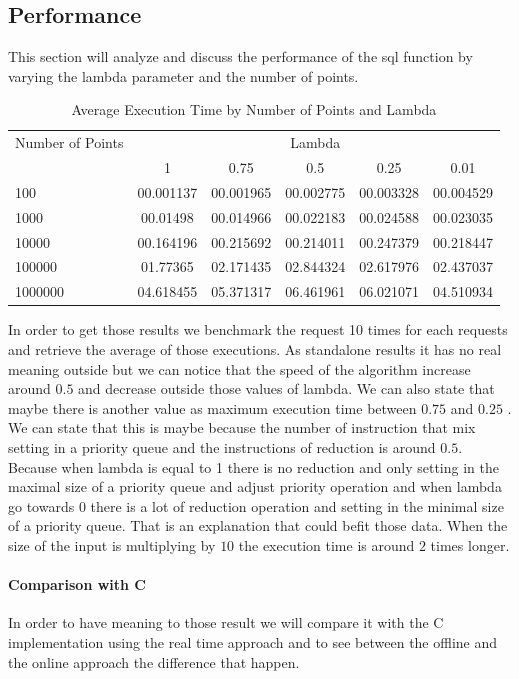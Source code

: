 \subsection{Performance}
This section will analyze and discuss the performance of the sql function by varying the lambda parameter and the number of points.
\begin{table}[htbp]
\centering
\label{tab:execution_time}
\begin{tabular}{@{}lccccc@{}}
\toprule
Number of Points & \multicolumn{5}{c}{Lambda} \\
\cmidrule{2-6}
& 1         & 0.75       & 0.5        & 0.25       & 0.01       \\
\midrule
100              & 00.001137 & 00.001965 & 00.002775 & 00.003328 & 00.004529 \\
1000             & 00.01498  & 00.014966 & 00.022183 & 00.024588 & 00.023035 \\
10000            & 00.164196 & 00.215692 & 00.214011 & 00.247379 & 00.218447 \\
100000           & 01.77365  & 02.171435 & 02.844324 & 02.617976 & 02.437037 \\
1000000          & 04.618455 & 05.371317 & 06.461961 & 06.021071 & 04.510934 \\
\bottomrule
\end{tabular}
\caption{Average Execution Time by Number of Points and Lambda}
\end{table}

In order to get those results we benchmark the request 10 times for each requests and retrieve the average of those executions. As standalone results it has no real meaning outside but we can notice that the speed of the algorithm increase around $0.5$ and decrease outside those values of lambda. We can also state that maybe there is another value as maximum execution time between $0.75$ and $0.25$ . We can state that this is maybe because the number of instruction that mix setting in a priority queue and the instructions of reduction is around $0.5$. Because when lambda is equal to 1 there is no reduction and only setting in the maximal size of a priority queue and adjust priority operation and when lambda go towards $0$ there is a lot of reduction operation and setting in the minimal size of a priority queue. That is an explanation that could befit those data. When the size of the input is multiplying by $10$ the execution time is around $2$ times longer.

\paragraph{Comparison with C}
In order to have meaning to those result we will compare it with the C implementation using the real time approach and to see between the offline and the online approach the difference that happen.


